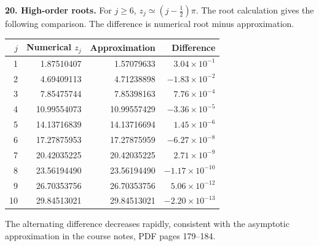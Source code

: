 \textbf{20. High-order roots.} For $j\ge6$, $z_j\simeq(j-\tfrac12)\pi$. The root calculation gives the following comparison. The difference is numerical root minus approximation.
\begin{center}
\begin{tabular}{rrrr}
\toprule
$j$ & Numerical $z_j$ & Approximation & Difference\\
\midrule
1 & 1.87510407 & 1.57079633 & $3.04\times10^{-1}$\\
2 & 4.69409113 & 4.71238898 & $-1.83\times10^{-2}$\\
3 & 7.85475744 & 7.85398163 & $7.76\times10^{-4}$\\
4 & 10.99554073 & 10.99557429 & $-3.36\times10^{-5}$\\
5 & 14.13716839 & 14.13716694 & $1.45\times10^{-6}$\\
6 & 17.27875953 & 17.27875959 & $-6.27\times10^{-8}$\\
7 & 20.42035225 & 20.42035225 & $2.71\times10^{-9}$\\
8 & 23.56194490 & 23.56194490 & $-1.17\times10^{-10}$\\
9 & 26.70353756 & 26.70353756 & $5.06\times10^{-12}$\\
10 & 29.84513021 & 29.84513021 & $-2.20\times10^{-13}$\\
\bottomrule
\end{tabular}
\end{center}
The alternating difference decreases rapidly, consistent with the asymptotic approximation in the course notes, PDF pages 179--184.


